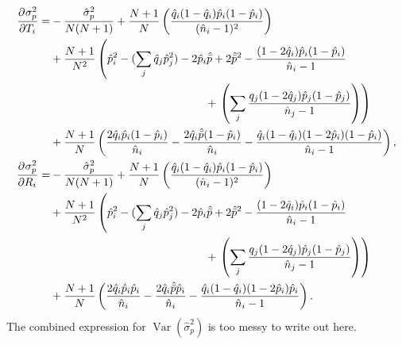 \documentclass[12pt]{article}
\newcommand{\pdiff}[3][\rule{0mm}{0mm}]{\frac{\partial^{#1} #2}{\partial {#3}^{#1}}}
\DeclareMathOperator{\var}{Var}
\newcommand{\prn}[1]{\left ( #1 \right )}
\begin{document}
\begin{equation}\label{eq:varsigmap}
  \begin{aligned}
    \pdiff{\sigma_p^2}{T_i} =& -\frac{\hat{\sigma}_p^2}{N(N+1)} + \frac{N+1}{N} \prn{\frac{\hat{q}_i (1-\hat{q}_i) \hat{p}_i (1-\hat{p}_i)} {(\hat{n}_i-1)^2}}
    \\ &+
    \frac{N+1}{N^2} \prn{ \hat{p}_i^2 - (\sum_j \hat{q}_j\hat{p}_j^2) - 2 \hat{p}_i\hat{\bar{p}} + 2 \hat{\bar{p}}^2 - \frac{(1-2\hat{q}_i) \hat{p}_i (1-\hat{p}_i)} {\hat{n}_i-1}
    \right.\\&\phantom{\prn{\frac{N+1}{N^2}}\hat{p}_i^2 - (\sum_j \hat{q}_j\hat{p}_j^2)- 2 \hat{p}_i\hat{\bar{p}}}+\left.
    \prn{\sum_j \frac{q_j(1-2\hat{q}_j) \hat{p}_j (1-\hat{p}_j)} {\hat{n}_j-1} }
    }\\&+
    \frac{N+1}{N} \prn{  \frac{2\hat{q}_i \hat{p}_i (1-\hat{p}_i)} {\hat{n}_i} - \frac{2\hat{q}_i \hat{\bar{p}} (1-\hat{p}_i)} {\hat{n}_i} -  \frac{\hat{q}_i(1-\hat{q}_i) (1-2\hat{p}_i) (1-\hat{p}_i)} {\hat{n}_i-1}
    },\\
    \pdiff{\sigma_p^2}{R_i} =&
    -\frac{\hat{\sigma}_p^2}{N(N+1)} + \frac{N+1}{N} \prn{\frac{\hat{q}_i (1-\hat{q}_i) \hat{p}_i (1-\hat{p}_i)} {(\hat{n}_i-1)^2}}
    \\ &+
    \frac{N+1}{N^2} \prn{ \hat{p}_i^2 - (\sum_j \hat{q}_j\hat{p}_j^2) - 2 \hat{p}_i\hat{\bar{p}} + 2 \hat{\bar{p}}^2 - \frac{(1-2\hat{q}_i) \hat{p}_i (1-\hat{p}_i)} {\hat{n}_i-1}
    \right.\\&\phantom{\prn{\frac{N+1}{N^2}}\hat{p}_i^2 - (\sum_j \hat{q}_j\hat{p}_j^2)- 2 \hat{p}_i\hat{\bar{p}}}+\left.
    \prn{\sum_j \frac{q_j(1-2\hat{q}_j) \hat{p}_j (1-\hat{p}_j)} {\hat{n}_j-1} }
    }\\&+
    \frac{N+1}{N} \prn{  \frac{2\hat{q}_i \hat{p}_i \hat{p}_i} {\hat{n}_i} - \frac{2\hat{q}_i \hat{\bar{p}} \hat{p}_i} {\hat{n}_i} -  \frac{\hat{q}_i(1-\hat{q}_i) (1-2\hat{p}_i) \hat{p}_i} {\hat{n}_i-1}
    }.
  \end{aligned}
\end{equation}
%
The combined expression for $\var(\hat{\sigma}_p^2)$ is too messy to write out here.
\end{document}
